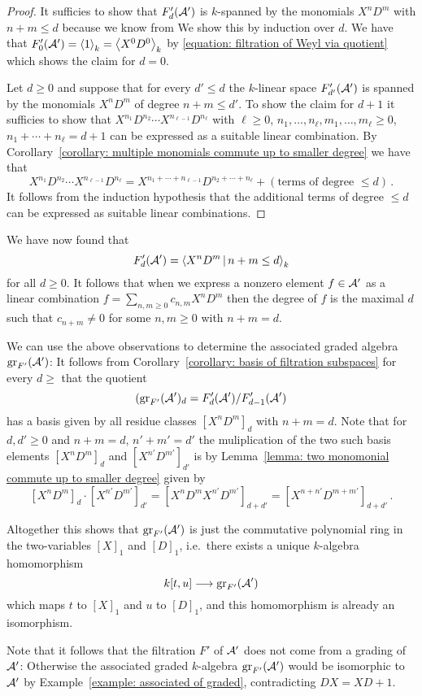 \begin{proof}
  It sufficies to show that $F'_d(\mathcal{A}')$ is $k$-spanned by the monomials $X^n D^m$ with $n+m \leq d$ because we know from 
  We show this by induction over $d$.
  We have that $F'_0(\mathcal{A}') = \left\langle 1 \right\rangle_k = \left\langle X^0 D^0 \right\rangle_k$ by \eqref{equation: filtration of Weyl via quotient} which shows the claim for $d = 0$.
  
  Let $d \geq 0$ and suppose that for every $d' \leq d$ the $k$-linear space $F'_{d'}(\mathcal{A}')$ is spanned by the monomials $X^n D^m$ of degree $n + m \leq d'$.
  To show the claim for $d + 1$ it sufficies to show that $X^{n_1} D^{n_2} \dotsm X^{n_{\ell-1}} D^{n_\ell}$ with $\ell \geq 0$, $n_1, \dotsc, n_\ell, m_1, \dotsc, m_\ell \geq 0$, $n_1 + \dotsb + n_\ell = d+1$ can be expressed as a suitable linear combination.
  By Corollary~\ref{corollary: multiple monomials commute up to smaller degree} we have that
  \[
      X^{n_1} D^{n_2} \dotsm X^{n_{\ell-1}} D^{n_\ell}
    =   X^{n_1 + \dotsb + n_{\ell-1}} D^{n_2 + \dotsb + n_\ell}
      + (\text{terms of degree $\leq d$}) \,.
  \]
  It follows from the induction hypothesis that the additional terms of degree $\leq d$ can be expressed as suitable linear combinations.
\end{proof}


\begin{fluff}
  We have now found that
  \[
      F'_d(\mc{A}')
    = \gen{
        X^n D^m
      \suchthat
        n + m \leq d
      }_k
  \]
  for all $d \geq 0$.
  It follows that when we express a nonzero element $f \in \mathcal{A}'$ as a linear combination $f = \sum_{n, m \geq 0} c_{n,m} X^n D^m$ then the degree of $f$ is the maximal $d$ such that $c_{n+m} \neq 0$ for some $n, m \geq 0$ with $n+m = d$.
  
  We can use the above observations to determine the associated graded algebra $\operatorname{gr}_{F'}(\mathcal{A}')$:
  It follows from Corollary~\ref{corollary: basis of filtration subspaces} for every $d \geq $ that the quotient
  \[
      (\operatorname{gr}_{F'}(\mathcal{A}')_d
    = F'_d(\mathcal{A}') / F'_{d-1}(\mathcal{A}')
  \]
  has a basis given by all residue classes $[X^n D^m]_d$ with $n + m = d$.
  Note that for $d, d' \geq 0$ and $n + m = d$, $n' + m' = d'$ the muliplication of the two such basis elements $[X^n D^m]_d$ and $[X^{n'} D^{m'}]_{d'}$ is by Lemma~\ref{lemma: two monomonial commute up to smaller degree} given by
  \[
      [X^n D^m]_d \cdot [X^{n'} D^{m'}]_{d'}
    = [X^n D^m X^{n'} D^{m'}]_{d + d'}
    = [X^{n + n'} D^{m + m'}]_{d + d'} \,.
  \]
  
  Altogether this shows that $\operatorname{gr}_{F'}(\mathcal{A}')$ is just the commutative polynomial ring in the two-variables $[X]_1$ and $[D]_1$, i.e.\ there exists a unique $k$-algebra homomorphism
  \[
            k[t,u]
    \longrightarrow \operatorname{gr}_{F'}(\mathcal{A}')
  \]
  which maps $t$ to $[X]_1$ and $u$ to $[D]_1$, and this homomorphism is already an isomorphism.
  
  Note that it follows that the filtration $F'$ of $\mathcal{A}'$ does not come from a grading of $\mathcal{A}'$:
  Otherwise the associated graded $k$-algebra $\operatorname{gr}_{F'}(\mathcal{A}')$ would be isomorphic to $\mathcal{A}'$ by Example~\ref{example: associated of graded}, contradicting $DX = XD + 1$.
\end{fluff}


